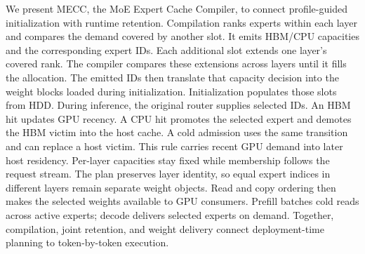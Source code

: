 \documentclass[conference,9pt,letterpaper]{IEEEtran}
\newcommand{\mecc}{\textsc{MECC}}
\begin{document}
We present \mecc{}, the MoE Expert Cache Compiler, to connect profile-guided initialization with runtime retention. Compilation ranks experts within each layer and compares the demand covered by another slot. It emits HBM/CPU capacities and the corresponding expert IDs. Each additional slot extends one layer's covered rank. The compiler compares these extensions across layers until it fills the allocation. The emitted IDs then translate that capacity decision into the weight blocks loaded during initialization. Initialization populates those slots from HDD. During inference, the original router supplies selected IDs. An HBM hit updates GPU recency. A CPU hit promotes the selected expert and demotes the HBM victim into the host cache. A cold admission uses the same transition and can replace a host victim. This rule carries recent GPU demand into later host residency. Per-layer capacities stay fixed while membership follows the request stream. The plan preserves layer identity, so equal expert indices in different layers remain separate weight objects. Read and copy ordering then makes the selected weights available to GPU consumers. Prefill batches cold reads across active experts; decode delivers selected experts on demand. Together, compilation, joint retention, and weight delivery connect deployment-time planning to token-by-token execution.
\end{document}
